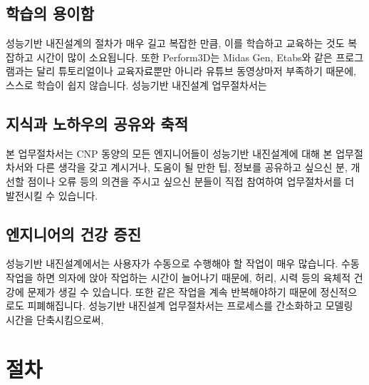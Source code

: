 \documentclass[a4paper,11pt,korean,openany,oneside]{sphinxmanual}
\begin{document}
\subsection{학습의 용이함}
\label{\detokenize{0_intro_latex:id4}}
\sphinxAtStartPar
성능기반 내진설계의 절차가 매우 길고 복잡한 만큼, 이를 학습하고 교육하는 것도 복잡하고 시간이 많이 소요됩니다.
또한 Perform\sphinxhyphen{}3D는 Midas Gen, Etabs와 같은 프로그램과는 달리 튜토리얼이나 교육자료뿐만 아니라 유튜브 동영상마저 부족하기 때문에,
스스로 학습이 쉽지 않습니다. 성능기반 내진설계 업무절차서는 


\subsection{지식과 노하우의 공유와 축적}
\label{\detokenize{0_intro_latex:id5}}
\sphinxAtStartPar
본 업무절차서는 CNP 동양의 모든 엔지니어들이 
성능기반 내진설계에 대해 본 업무절차서와 다른 생각을 갖고 계시거나, 도움이 될 만한 팁, 정보를 공유하고 싶으신 분,
개선할 점이나 오류 등의 의견을 주시고 싶으신 분들이 직접 참여하여 업무절차서를 더 발전시킬 수 있습니다.


\subsection{엔지니어의 건강 증진}
\label{\detokenize{0_intro_latex:id6}}
\sphinxAtStartPar
성능기반 내진설계에서는 사용자가 수동으로 수행해야 할 작업이 매우 많습니다.
수동 작업을 하면 의자에 앉아 작업하는 시간이 늘어나기 때문에, 허리, 시력 등의 육체적 건강에 문제가 생길 수 있습니다.
또한 같은 작업을 계속 반복해야하기 때문에 정신적으로도 피폐해집니다.
성능기반 내진설계 업무절차서는 프로세스를 간소화하고 모델링 시간을 단축시킴으로써, 


\section{절차}
\label{\detokenize{0_intro_latex:id7}}
\begin{figure}[htbp]
\centering

\noindent{}
\end{figure}
\end{document}
